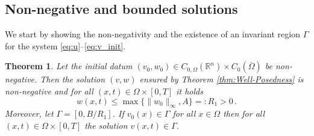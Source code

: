\documentclass[preprint,12pt]{elsarticle}
\theoremstyle{plain}
\newtheorem{thm}{Theorem}[section]
\theoremstyle{definition}
\theoremstyle{remark}
\begin{document}
\subsection{Non-negative and bounded solutions} 
We start by showing the non-negativity and the existence of an invariant region $\Gamma$ for the system \eqref{eq:u}--\eqref{eq:v_init}.
\begin{thm}
    \label{thm:Non-negativity}
     Let the initial datum $(v_0, w_0) \in C_{0, \Omega}(\mathbb{R}^n) \times C_0(\overline{\Omega})$ be non-negative. Then the solution $(v, w)$ ensured by Theorem \ref{thm:Well-Posedness} is non-negative and for all $(x, t) \in \Omega \times [0, T]$ it holds
     \begin{equation}
         w(x,t) \leq \max\{\|w_0\|_\infty, A\} =: R_1 >0\,.
     \end{equation}
     Moreover, let $\Gamma = [0, B/R_1]$. If  $v_0(x) \in \Gamma$ for all $x \in \Omega$ then for all $(x, t) \in \Omega \times [0, T]$ the solution $v(x,t) \in \Gamma$.
\end{thm}
\end{document}
